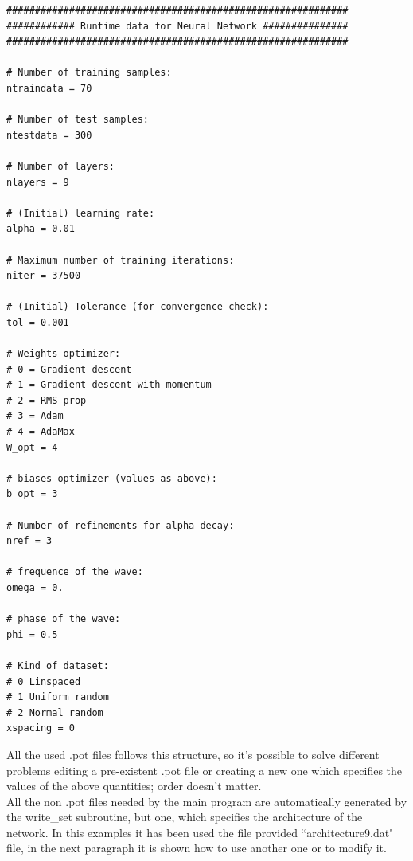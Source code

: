 \documentclass[12pt, a4paper]{report}
\theoremstyle{definition}
\begin{document}
\begin{lstlisting}[frame=single,showstringspaces=false]
############################################################
############ Runtime data for Neural Network ###############
############################################################

# Number of training samples:
ntraindata = 70

# Number of test samples:
ntestdata = 300

# Number of layers:
nlayers = 9

# (Initial) learning rate:
alpha = 0.01

# Maximum number of training iterations:
niter = 37500

# (Initial) Tolerance (for convergence check):
tol = 0.001

# Weights optimizer:
# 0 = Gradient descent
# 1 = Gradient descent with momentum
# 2 = RMS prop
# 3 = Adam
# 4 = AdaMax
W_opt = 4

# biases optimizer (values as above):
b_opt = 3

# Number of refinements for alpha decay:
nref = 3

# frequence of the wave:
omega = 0.

# phase of the wave:
phi = 0.5

# Kind of dataset:
# 0 Linspaced
# 1 Uniform random
# 2 Normal random
xspacing = 0
\end{lstlisting}
\noindent All the used .pot files follows this structure, so it's possible to solve different problems editing a pre-existent .pot file or creating a new one which specifies the values of the above quantities; order doesn't matter.\\
All the non .pot files needed by the main program are automatically generated by the write\_set subroutine, but one, which specifies the architecture of the network. In this examples it has been used the file provided ``architecture9.dat" file, in the next paragraph it is shown how to use another one or to modify it.
\end{document}
